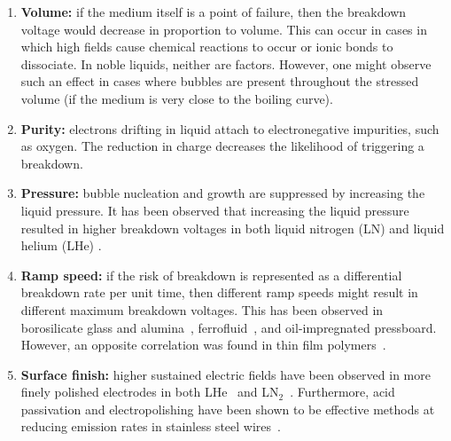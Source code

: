\begin{enumerate}
    \item \textbf{Volume:} if the medium itself is a point of failure, then the breakdown voltage would decrease in proportion to volume.
    This can occur in cases in which high fields cause chemical reactions to occur or ionic bonds to dissociate. In noble liquids, neither are factors. However, one might observe such an effect in cases where bubbles are present throughout the stressed volume (if the medium is very close to the boiling curve).
    \item \textbf{Purity:} electrons drifting in liquid attach to electronegative impurities, such as oxygen.
    The reduction in charge decreases the  likelihood of triggering a breakdown. 
    \item \textbf{Pressure:} bubble nucleation and growth are suppressed by increasing the liquid pressure.
    It has been observed that increasing the liquid pressure resulted in higher breakdown voltages in both liquid nitrogen (LN) \cite{hayakawa_breakdown_1997} and liquid helium (LHe) \cite{gerhold_about_1996,phan_study_2021}.
    \item \textbf{Ramp speed:} if the risk of breakdown is represented as a differential breakdown rate per unit time, then different ramp speeds might result in different  maximum breakdown voltages. 
    This has been observed in borosilicate glass and alumina~\cite{fischer_influence_2021}, ferrofluid~\cite{ bartko_effect_2020}, and oil-impregnated pressboard\cite{nedjar_weibull_2013}.
    However, an opposite correlation was found in thin film polymers~\cite{thomas_effect_2006}.
    \item \textbf{Surface finish:} higher sustained electric fields have been observed in more finely polished electrodes in both LHe~\cite{gerhold_gap_1994,gerhold_breakdown_1989,phan_study_2021} and LN$_2$~\cite{goshima_statistical_1994}.
    Furthermore, acid passivation and electropolishing have been shown to be effective methods at reducing emission rates in stainless steel wires~\cite{tomas_study_2018}.
\end{enumerate}
\afterpage{\FloatBarrier}

